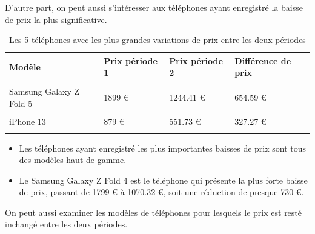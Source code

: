 \documentclass[
  12pt,
]{report}
\begin{document}
D'autre part, on peut aussi s'intéresser aux téléphones ayant enregistré
la baisse de prix la plus significative.

\begin{table}[!h]

\caption{\label{tab:unnamed-chunk-21}Les 5 téléphones avec les plus grandes variations de prix entre les deux périodes}
\centering
\begin{tabular}[t]{llll}
\toprule
\textbf{Modèle} & \textbf{Prix période 1} & \textbf{Prix période 2} & \textbf{Différence de prix}\\
\midrule
\cellcolor{gray!6}{Samsung Galaxy Z Fold 4} & \cellcolor{gray!6}{1799 €} & \cellcolor{gray!6}{1070.32 €} & \cellcolor{gray!6}{728.68 €}\\
Samsung Galaxy Z Fold 5 & 1899 € & 1244.41 € & 654.59 €\\
\cellcolor{gray!6}{Samsung Galaxy Z Flip 5} & \cellcolor{gray!6}{1199 €} & \cellcolor{gray!6}{783.9 €} & \cellcolor{gray!6}{415.1 €}\\
iPhone 13 & 879 € & 551.73 € & 327.27 €\\
\cellcolor{gray!6}{iPhone 14 Plus} & \cellcolor{gray!6}{969 €} & \cellcolor{gray!6}{704.9 €} & \cellcolor{gray!6}{264.1 €}\\
\bottomrule
\end{tabular}
\end{table}

\begin{itemize}
\item
  Les téléphones ayant enregistré les plus importantes baisses de prix
  sont tous des modèles haut de gamme.
\item
  Le Samsung Galaxy Z Fold 4 est le téléphone qui présente la plus forte
  baisse de prix, passant de 1799 € à 1070.32 €, soit une réduction de
  presque 730 €.
\end{itemize}

On peut aussi examiner les modèles de téléphones pour lesquels le prix
est resté inchangé entre les deux périodes.

\vspace{3em}
\end{document}
